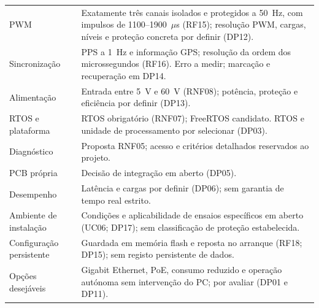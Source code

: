 \begin{longtable}{@{}>{\raggedright\arraybackslash}p{}>{\raggedright\arraybackslash}p{}@{}}
PWM & Exatamente três canais isolados e protegidos a 50~Hz, com impulsos de 1100--1900~$\mu$s (RF15); resolução PWM, cargas, níveis e proteção concreta por definir (DP12). \\
Sincronização & PPS a 1~Hz e informação GPS; resolução da ordem dos microssegundos (RF16). Erro a medir; marcação e recuperação em DP14. \\
Alimentação & Entrada entre 5~V e 60~V (RNF08); potência, proteção e eficiência por definir (DP13). \\
RTOS e plataforma & RTOS obrigatório (RNF07); FreeRTOS candidato. RTOS e unidade de processamento por selecionar (DP03). \\
Diagnóstico & Proposta RNF05; acesso e critérios detalhados reservados ao projeto. \\
PCB própria & Decisão de integração em aberto (DP05). \\
Desempenho & Latência e cargas por definir (DP06); sem garantia de tempo real estrito. \\
Ambiente de instalação & Condições e aplicabilidade de ensaios específicos em aberto (UC06; DP17); sem classificação de proteção estabelecida. \\
Configuração persistente & Guardada em memória flash e reposta no arranque (RF18; DP15); sem registo persistente de dados. \\
Opções desejáveis & Gigabit Ethernet, PoE, consumo reduzido e operação autónoma sem intervenção do PC; por avaliar (DP01 e DP11). \\
\end{longtable}
\endgroup
